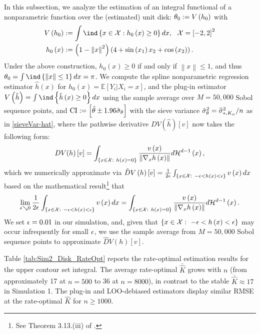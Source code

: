 \documentclass[12pt,american]{article}
\theoremstyle{definition}
\theoremstyle{plain}
\theoremstyle{definition}
\theoremstyle{plain}
\theoremstyle{plain}
\theoremstyle{plain}
\theoremstyle{plain}
\theoremstyle{plain}
\newcommand{\E}{\mathbb{E}}
\newcommand{\norm}[1]{\left\| #1 \right\|}
\begin{document}
In this subsection, we analyze the estimation of an integral functional
of a nonparametric function over the (estimated) unit
disk: $\theta_{0}:=V\left(h_{0}\right)$ with
\begin{align*}
  V\left(h_0 \right) & :=\int\ind\left\{ x\in{\cal X}:h_{0}\left(x\right)\geq0\right\} dx,~~{\cal X}=\left[-2,2\right]^{2}\\
  h_{0}\left(x\right) & :=\left(1-\norm x^{2}\right)\left(4+\sin\left(x_{1}\right)x_{2}+\cos\left(x_{2}\right)\right).
\end{align*}
Under the above construction, $h_{0}\left(x\right)\geq0$ if and only
if $\norm x\leq1$, and thus
$\t_{0}=\int\ind\left\{ \norm x\leq1\right\} dx=\pi$.
We compute the spline nonparametric regression estimator $\hat{h}\left(x\right)$ for $h_0(x)= \E[Y_i|X_i=x]$, and the plug-in estimator $V\left(\hat{h}\right)=\int\ind\left\{ \hat{h}\left(x\right)\geq0\right\} dx$
using the sample average over $M=50,000$ Sobol sequence points, and
$\text{CI}:=\left[\hat{\theta}\pm1.96\hat{\sigma}_{\theta}\right]$ with the sieve variance $\hat{\sigma}_{\theta}^{2}=\widehat{\sigma}^2_{*,K_{n}}/n$ as in \eqref{sieveVar-hat},
where the pathwise derivative $DV\left(\hat{h}\right)\left[v\right]$
now takes the following form:
\[
  DV(h)\left[v\right]=\int_{\left\{x\in{\cal X}:~ h\left(x\right)=0\right\} }\frac{v\left(x\right)}{\norm{\Dif_{x}h\left(x\right)}}d{\cal H}^{d-1}\left(x\right),
\]
which we numerically approximate via
$\hat{D}V\left(h\right)\left[v\right]=\frac{1}{2\epsilon}\int_{\left\{x\in{\cal X}:~ -\epsilon<h\left(x\right)<\epsilon\right\} }v\left(x\right)dx$ based on the mathematical result\footnote{See Theorem 3.13.(iii) of \citet*{evans2015measure}.}
that
\[
  \lim_{\e\downto0}\frac{1}{2\e}\int_{\left\{x\in{\cal X}:~ -\e<h\left(x\right)<\e\right\} }v\left(x\right)dx=\int_{\left\{x\in{\cal X}:~ h\left(x\right)=0\right\} }\frac{v\left(x\right)}{\norm{\Dif_{x}h\left(x\right)}}d{\cal H}^{d-1}\left(x\right).
\]
We set $\epsilon=0.01$ in our simulation, and, given that $\left\{x\in{\cal X}:~ -\epsilon<h\left(x\right)<\epsilon\right\} $
may occur infrequently for small $\epsilon$, we use the sample average
from $M=50,000$ Sobol sequence points to approximate $\hat{D}V\left(h\right)\left[v\right]$.

Table \ref{tab:Sim2_Disk_RateOpt} reports the rate-optimal estimation results for the upper contour set integral. The average rate-optimal $\bar{\hat{K}}$ grows with $n$ (from approximately 17 at $n=500$ to 36 at $n=8000$), in contrast to the stable $\bar{\hat{K}} \approx 17$ in Simulation 1. The plug-in and LOO-debiased estimators display similar RMSE at the rate-optimal $\hat{K}$ for $n\geq 1000$.
\end{document}
